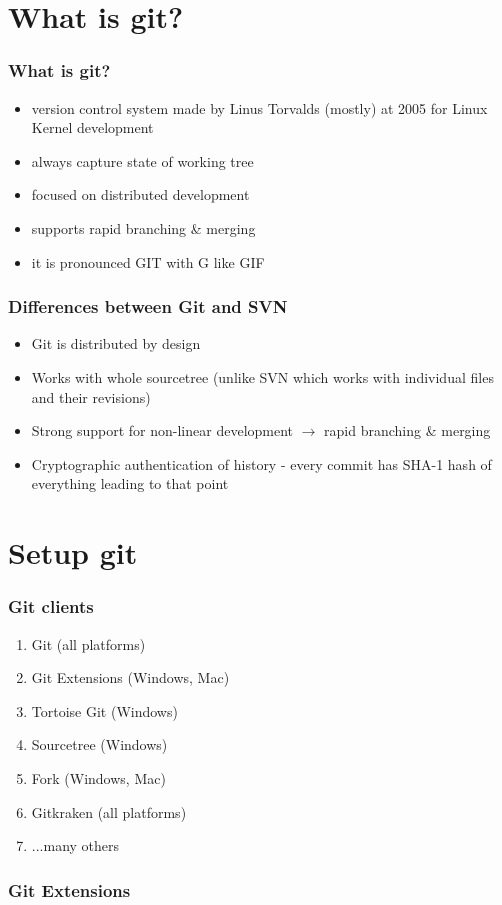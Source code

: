 \documentclass{beamer}
\begin{document}
    \section{What is git?}
    \begin{frame}
        \frametitle{What is git?}
        \begin{itemize}
            \item version control system made by Linus Torvalds (mostly) at 2005 for Linux Kernel development
            \item always capture state of working tree
            \item focused on distributed development
            \item supports rapid branching \& merging
            \item it is pronounced GIT with G like GIF ~
        \end{itemize}
    \end{frame}
    \begin{frame}
        \frametitle{Differences between Git and SVN}
        \begin{itemize}
            \item Git is distributed by design
            \item Works with whole sourcetree (unlike SVN which works with individual files and their revisions)
            \item Strong support for non-linear development $\rightarrow$ rapid branching \& merging
            \item Cryptographic authentication of history - every commit has SHA-1 hash of everything leading to that point
        \end{itemize}
    \end{frame}
    \section{Setup git}
    \begin{frame}
        \frametitle{Git clients}
        \begin{enumerate}
            \item Git (all platforms)
            \item Git Extensions (Windows, Mac)
            \item Tortoise Git (Windows)
            \item Sourcetree (Windows)
            \item Fork (Windows, Mac)
            \item Gitkraken (all platforms)
            \item ...many others
        \end{enumerate}
    \end{frame}
    \begin{frame}
        \frametitle{Git Extensions}
        
    \end{frame}
    
\end{document}
